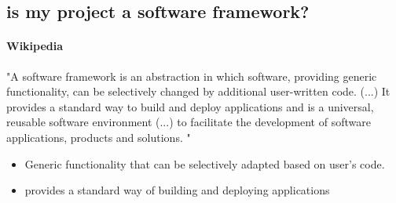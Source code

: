         \subsection{is my project a software framework?}

            \paragraph*{Wikipedia} "A software framework is an abstraction in which software, providing generic functionality, can be selectively changed by additional user-written code.
            (...)
            It provides a standard way to build and deploy applications and is a universal, reusable software environment 
            (...)
            to facilitate the development of software applications, products and solutions. "
            
            \begin{itemize}
                \item Generic functionality that can be selectively adapted based on user's code.
                \item provides a standard way of building and deploying applications
            \end{itemize}



            






